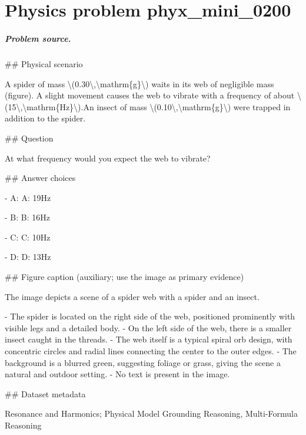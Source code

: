 
\chapter{Physics problem phyx\_mini\_0200}
\label{ch:PhyXMiniProblems_problem_phyx_mini_0200}

\paragraph{Problem source.}
\#\# Physical scenario

A spider of mass \textbackslash{}(0.30\textbackslash{},\textbackslash{}mathrm\{g\}\textbackslash{}) waits in its web of negligible mass (figure). A slight movement causes the web to vibrate with a frequency of about \textbackslash{}(15\textbackslash{},\textbackslash{}mathrm\{Hz\}\textbackslash{}).An insect of mass \textbackslash{}(0.10\textbackslash{},\textbackslash{}mathrm\{g\}\textbackslash{}) were trapped in addition to the spider.

\#\# Question

At what frequency would you expect the web to vibrate?

\#\# Answer choices

- A: A: 19Hz

- B: B: 16Hz

- C: C: 10Hz

- D: D: 13Hz

\#\# Figure caption (auxiliary; use the image as primary evidence)

The image depicts a scene of a spider web with a spider and an insect. 

- The spider is located on the right side of the web, positioned prominently with visible legs and a detailed body.
- On the left side of the web, there is a smaller insect caught in the threads.
- The web itself is a typical spiral orb design, with concentric circles and radial lines connecting the center to the outer edges.
- The background is a blurred green, suggesting foliage or grass, giving the scene a natural and outdoor setting.
- No text is present in the image.

\#\# Dataset metadata

Resonance and Harmonics; Physical Model Grounding Reasoning, Multi-Formula Reasoning

